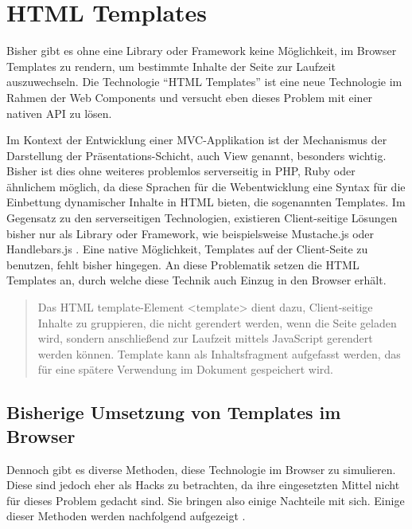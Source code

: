 \section{HTML Templates}\label{html-templates}

Bisher gibt es ohne eine Library oder Framework keine Möglichkeit, im Browser Templates zu rendern, um bestimmte Inhalte der Seite zur Laufzeit auszuwechseln. Die Technologie ``HTML Templates'' ist eine neue Technologie im Rahmen der Web Components und versucht eben dieses Problem mit einer nativen API zu lösen.

Im Kontext der Entwicklung einer MVC-Applikation ist der Mechanismus der Darstellung der Präsentations-Schicht, auch View genannt, besonders wichtig. Bisher ist dies ohne weiteres problemlos serverseitig in PHP, Ruby oder ähnlichem möglich, da diese Sprachen für die Webentwicklung eine Syntax für die Einbettung dynamischer Inhalte in HTML bieten, die sogenannten Templates. Im Gegensatz zu den serverseitigen Technologien, existieren Client-seitige Lösungen bisher nur als Library oder Framework, wie beispielsweise Mustache.js oder Handlebars.js \cite{citeulike:13853015}. Eine native Möglichkeit, Templates auf der Client-Seite zu benutzen, fehlt bisher hingegen. An diese Problematik setzen die HTML Templates an, durch welche diese Technik auch Einzug in den Browser erhält.

\begin{quote}
Das HTML template-Element <template> dient dazu, Client-seitige Inhalte zu gruppieren, die nicht gerendert werden, wenn die Seite geladen wird, sondern anschließend zur Laufzeit mittels JavaScript gerendert werden können. Template kann als Inhaltsfragment aufgefasst werden, das für eine spätere Verwendung im Dokument gespeichert wird. \cite{citeulike:13852997}
\end{quote}


\subsection{Bisherige Umsetzung von Templates im Browser}\label{bisherige-umsetzung-von-templates-im-browser}

Dennoch gibt es diverse Methoden, diese Technologie im Browser zu simulieren. Diese sind jedoch eher als Hacks zu betrachten, da ihre eingesetzten Mittel nicht für dieses Problem gedacht sind. Sie bringen also einige Nachteile mit sich. Einige dieser Methoden werden nachfolgend aufgezeigt \cite{citeulike:13853018}.

